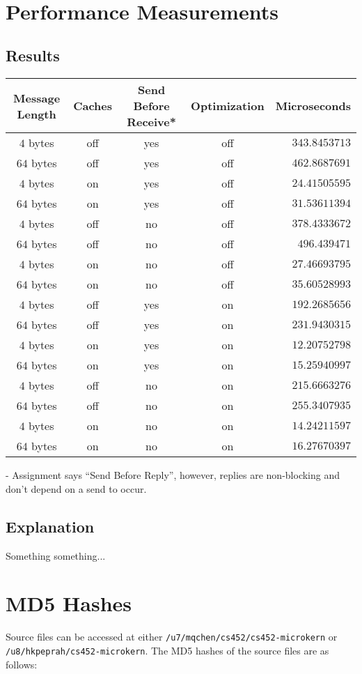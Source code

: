 \documentclass[12pt]{article}
\begin{document}
\\[2\baselineskip]

\section{Performance Measurements}
\subsection{Results}
\begin{tabular}{|c|c|c|c|r|}
  \hline
  {\bf Message Length} & {\bf Caches} & {\bf Send Before Receive*} & {\bf Optimization } & {\bf Microseconds} \\\hline
  $4$ bytes & off & yes & off & $343.8453713$ \\\hline
  $64$ bytes & off & yes & off & $462.8687691$ \\\hline
  $4$ bytes & on & yes & off & $24.41505595$ \\\hline
  $64$ bytes & on & yes & off & $31.53611394$ \\\hline
  $4$ bytes & off & no & off & $378.4333672$ \\\hline
  $64$ bytes & off & no & off & $496.439471$ \\\hline
  $4$ bytes & on & no & off & $27.46693795$ \\\hline
  $64$ bytes & on & no & off & $35.60528993$ \\\hline
  $4$ bytes & off & yes & on & $192.2685656$ \\\hline
  $64$ bytes & off & yes & on & $231.9430315$ \\\hline
  $4$ bytes & on & yes & on & $12.20752798$ \\\hline
  $64$ bytes & on & yes & on & $15.25940997$ \\\hline
  $4$ bytes & off & no & on & $215.6663276$ \\\hline
  $64$ bytes & off & no & on & $255.3407935$ \\\hline
  $4$ bytes & on & no & on & $14.24211597$ \\\hline
  $64$ bytes & on & no & on & $16.27670397$ \\\hline
\end{tabular}
{\tiny {\bf *} - Assignment says ``Send Before Reply'', however, replies are non-blocking and don't depend on a send to occur.}
\\[1\baselineskip]
\subsection{Explanation}
Something something...
\\[2\baselineskip]
\section{MD5 Hashes}
Source files can be accessed at either \texttt{/u7/mqchen/cs452/cs452-microkern} or \\ \texttt{/u8/hkpeprah/cs452-microkern}. The MD5 hashes of the source files are as follows:\\

\end{document}
